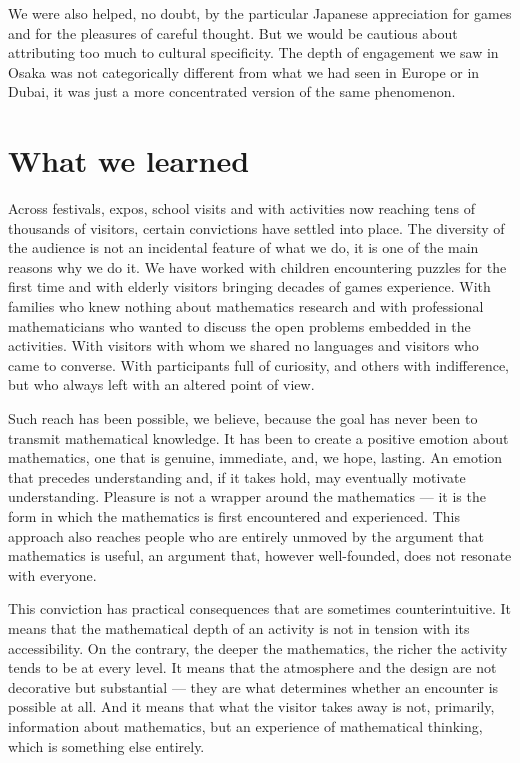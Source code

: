 \documentclass{notices}
\begin{document}
We were also helped, no doubt, by the particular Japanese appreciation for games and for the pleasures of careful thought. But we would be cautious about attributing too much to cultural specificity. The depth of engagement we saw in Osaka was not categorically different from what we had seen in Europe or in Dubai, it was just a more concentrated version of the same phenomenon.

\section*{What we learned}

Across festivals, expos, school visits and with activities now reaching tens of thousands of visitors, certain convictions have settled into place. The diversity of the audience is not an incidental feature of what we do, it is one of the main reasons why we do it. We have worked with children encountering puzzles for the first time and with elderly visitors bringing decades of games experience. With families who knew nothing about mathematics research and with professional mathematicians who wanted to discuss the open problems embedded in the activities. With visitors with whom we shared no languages and visitors who came to converse. With participants full of curiosity, and others with indifference, but who always left with an altered point of view. 

Such reach has been possible, we believe, because the goal has never been to transmit mathematical knowledge. It has been to create a positive emotion about mathematics, one that is genuine, immediate, and, we hope, lasting. An emotion that precedes understanding and, if it takes hold, may eventually motivate understanding. Pleasure is not a wrapper around the mathematics --- it is the form in which the mathematics is first encountered and experienced. This approach also reaches people who are entirely unmoved by the argument that mathematics is useful, an argument that, however well-founded, does not resonate with everyone.

This conviction has practical consequences that are sometimes counterintuitive. It means that the mathematical depth of an activity is not in tension with its accessibility. On the contrary, the deeper the mathematics, the richer the activity tends to be at every level. It means that the atmosphere and the design are not decorative but substantial --- they are what determines whether an encounter is possible at all. And it means that what the visitor takes away is not, primarily, information about mathematics, but an experience of mathematical thinking, which is something else entirely.
\end{document}
